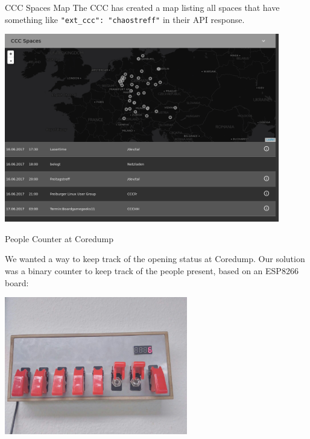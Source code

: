 \begin{frame}{CCC Spaces Map}
	The CCC has created a map listing all spaces that have something like
	\texttt{"ext\_ccc": "chaostreff"} in their API response.

	\vspace{1em}
	\centerline{
		\includegraphics[width=0.9\textwidth]{what_is_the_spaceapi/app-ccc.png}
	}

\end{frame}

\begin{frame}{People Counter at Coredump}

	We wanted a way to keep track of the opening status at Coredump.
	Our solution was a binary counter to keep track of the people present, based
	on an ESP8266 board:
	
	\vspace{1em}
	\centerline{
		\includegraphics[width=0.6\textwidth]{what_is_the_spaceapi/counter.jpg}
	}

\end{frame}

